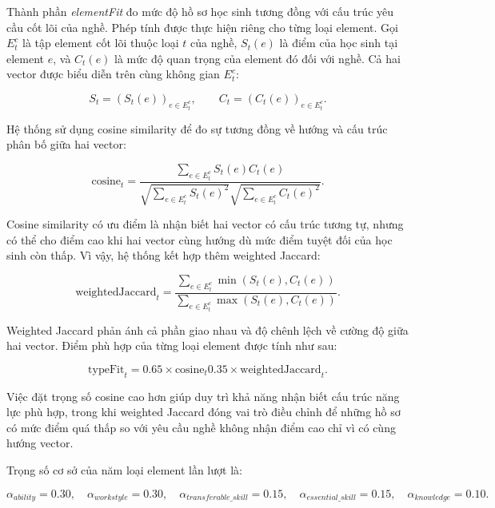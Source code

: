 Thành phần \textit{elementFit} đo mức độ hồ sơ học sinh tương đồng với cấu trúc yêu cầu cốt lõi của nghề. Phép tính được thực hiện riêng cho từng loại element. Gọi $E_t^c$ là tập element cốt lõi thuộc loại $t$ của nghề, $S_t(e)$ là điểm của học sinh tại element $e$, và $C_t(e)$ là mức độ quan trọng của element đó đối với nghề. Cả hai vector được biểu diễn trên cùng không gian $E_t^c$:

\begin{equation}
	S_t = \left(S_t(e)\right)_{e \in E_t^c},
	\qquad
	C_t = \left(C_t(e)\right)_{e \in E_t^c}.
\end{equation}

Hệ thống sử dụng cosine similarity để đo sự tương đồng về hướng và cấu trúc phân bố giữa hai vector:

\begin{equation}
	\text{cosine}_t
	=
	\frac{
		\sum\limits_{e \in E_t^c} S_t(e)C_t(e)
	}{
		\sqrt{\sum\limits_{e \in E_t^c}S_t(e)^2}
		\sqrt{\sum\limits_{e \in E_t^c}C_t(e)^2}
	}.
\end{equation}

Cosine similarity có ưu điểm là nhận biết hai vector có cấu trúc tương tự, nhưng có thể cho điểm cao khi hai vector cùng hướng dù mức điểm tuyệt đối của học sinh còn thấp. Vì vậy, hệ thống kết hợp thêm weighted Jaccard:

\begin{equation}
	\text{weightedJaccard}_t
	=
	\frac{
		\sum\limits_{e \in E_t^c}
		\min\left(S_t(e),C_t(e)\right)
	}{
		\sum\limits_{e \in E_t^c}
		\max\left(S_t(e),C_t(e)\right)
	}.
\end{equation}

Weighted Jaccard phản ánh cả phần giao nhau và độ chênh lệch về cường độ giữa hai vector. Điểm phù hợp của từng loại element được tính như sau:

\begin{equation}
	\text{typeFit}_t
	=
	0.65 \times \text{cosine}_t
	0.35 \times \text{weightedJaccard}_t.
\end{equation}

Việc đặt trọng số cosine cao hơn giúp duy trì khả năng nhận biết cấu trúc năng lực phù hợp, trong khi weighted Jaccard đóng vai trò điều chỉnh để những hồ sơ có mức điểm quá thấp so với yêu cầu nghề không nhận điểm cao chỉ vì có cùng hướng vector.

Trọng số cơ sở của năm loại element lần lượt là:

\begin{equation}
	\alpha_{ability}=0.30,\quad
	\alpha_{workstyle}=0.30,\quad
	\alpha_{transferable\_skill}=0.15,\quad
	\alpha_{essential\_skill}=0.15,\quad
	\alpha_{knowledge}=0.10.
\end{equation}

